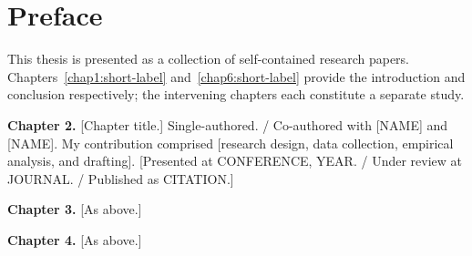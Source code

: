 %
%
\chapter*{Preface}

This thesis is presented as a collection of self-contained research
papers. Chapters~\ref{chap1:short-label} and~\ref{chap6:short-label}
provide the introduction and conclusion respectively; the intervening
chapters each constitute a separate study.

\vspace{0.5\baselineskip}
\noindent\textbf{Chapter 2.} [Chapter title.] Single-authored. /
Co-authored with [NAME] and [NAME]. My contribution comprised
[research design, data collection, empirical analysis, and drafting].
[Presented at CONFERENCE, YEAR. / Under review at JOURNAL. / Published
as CITATION.]

\vspace{0.5\baselineskip}
\noindent\textbf{Chapter 3.} [As above.]

\vspace{0.5\baselineskip}
\noindent\textbf{Chapter 4.} [As above.]

\clearpage
